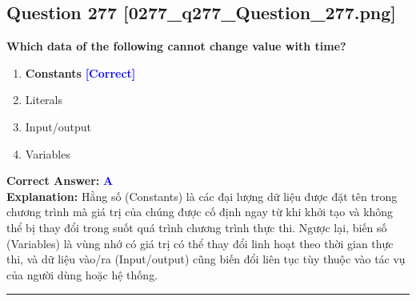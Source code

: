 \documentclass[11pt,a4paper]{article}
\begin{document}
\begin{minipage}{\textwidth}
\subsection*{Question 277 \quad \footnotesize{[0277\_q277\_Question\_277.png]}}
\noindent \textbf{Which data of the following cannot change value with time?}

\begin{enumerate}[label=\Alph*.]
    \item \textbf{Constants} \hfill \textcolor{blue}{\textbf{[Correct]}}
    \item Literals
    \item Input/output
    \item Variables
\end{enumerate}

\noindent \textbf{Correct Answer:} \textcolor{blue}{\textbf{A}} \\[2pt]
\noindent \textbf{Explanation:} Hằng số (Constants) là các đại lượng dữ liệu được đặt tên trong chương trình mà giá trị của chúng được cố định ngay từ khi khởi tạo và không thể bị thay đổi trong suốt quá trình chương trình thực thi. Ngược lại, biến số (Variables) là vùng nhớ có giá trị có thể thay đổi linh hoạt theo thời gian thực thi, và dữ liệu vào/ra (Input/output) cũng biến đổi liên tục tùy thuộc vào tác vụ của người dùng hoặc hệ thống.

\par\vspace{0.3cm}
\hrule
\vspace{0.3cm}
\end{minipage}
\end{document}

